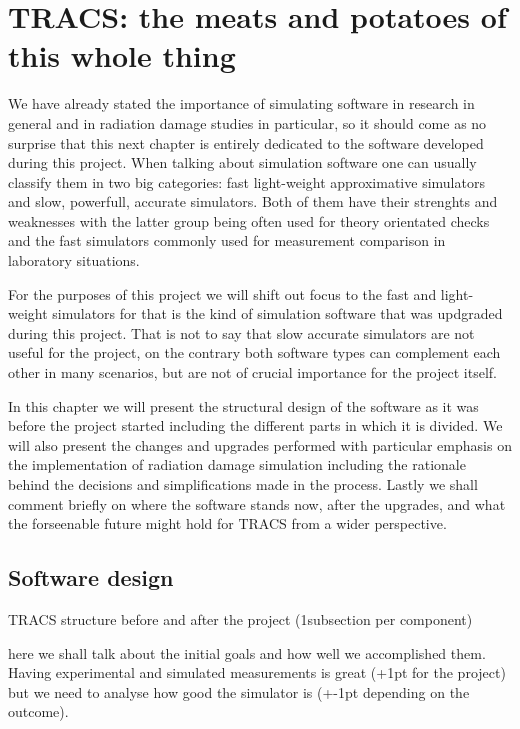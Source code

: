 \chapter{TRACS: the meats and potatoes of this whole thing}
\label{chap:Comp}

We have already stated the importance of simulating software in research in general and in radiation damage studies in particular, so it should come as no surprise that this next chapter is entirely dedicated to the software developed during this project. When talking about simulation software one can usually classify them in two big categories: fast light-weight approximative simulators and slow, powerfull, accurate simulators. Both of them have their strenghts and weaknesses with the latter group being often used for theory orientated checks and the fast simulators commonly used for measurement comparison in laboratory situations.

For the purposes of this project we will shift out focus to the fast and light-weight simulators for that is the kind of simulation software that was updgraded during this project. That is not to say that slow accurate simulators are not useful for the project, on the contrary both software types can complement each other in many scenarios, but are not of crucial importance for the project itself.

In this chapter we will present the structural design of the software as it was before the project started including the different parts in which it is divided. We will also present the changes and upgrades performed with particular emphasis on the implementation of radiation damage simulation including the rationale behind the decisions and simplifications made in the process. Lastly we shall comment briefly on where the software stands now, after the upgrades, and what the forseenable future might hold for TRACS from a wider perspective.

\section{Software design} %
\label{sec:results_and_achievements}

TRACS structure before and after the project (1subsection per component)

here we shall talk about the initial goals and how well we accomplished them. Having experimental and simulated measurements is great (+1pt for the project) but we need to analyse how good the simulator is (+-1pt depending on the outcome).

